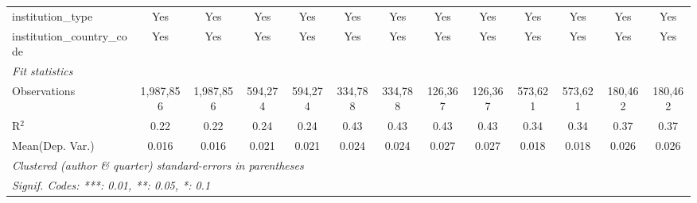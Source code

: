 \begin{tabular}{lcccccccccccc}
   institution\_type                        & Yes            & Yes            & Yes            & Yes            & Yes            & Yes             & Yes           & Yes            & Yes            & Yes            & Yes            & Yes\\  
   institution\_country\_code               & Yes            & Yes            & Yes            & Yes            & Yes            & Yes             & Yes           & Yes            & Yes            & Yes            & Yes            & Yes\\  
   \midrule
   \emph{Fit statistics}\\
   Observations                             & 1,987,856      & 1,987,856      & 594,274        & 594,274        & 334,788        & 334,788         & 126,367       & 126,367        & 573,621        & 573,621        & 180,462        & 180,462\\  
   R$^2$                                    & 0.22           & 0.22           & 0.24           & 0.24           & 0.43           & 0.43            & 0.43          & 0.43           & 0.34           & 0.34           & 0.37           & 0.37\\  
Mean(Dep. Var.) & 0.016 & 0.016 & 0.021 & 0.021 & 0.024 & 0.024 & 0.027 & 0.027 & 0.018 & 0.018 & 0.026 & 0.026 \\
   \midrule \midrule
   \multicolumn{13}{l}{\emph{Clustered (author \& quarter) standard-errors in parentheses}}\\
   \multicolumn{13}{l}{\emph{Signif. Codes: ***: 0.01, **: 0.05, *: 0.1}}\\
\end{tabular}
\par\endgroup
